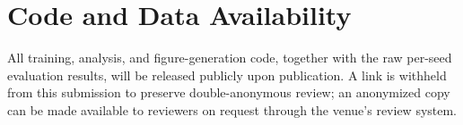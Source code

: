 \documentclass[journal]{IEEEtran}
\begin{document}
\section*{Code and Data Availability}
All training, analysis, and figure-generation code, together with the raw per-seed evaluation
results, will be released publicly upon publication. A link is withheld from this submission to
preserve double-anonymous review; an anonymized copy can be made available to reviewers on
request through the venue's review system.

{\footnotesize


}
\end{document}
